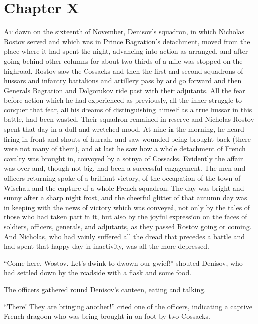 \chapter*{Chapter X}
\ifaudio     
{} 
\fi

\lettrine[lines=2, loversize=0.3, lraise=0]{\initfamily A}{t}
dawn on the sixteenth of November, Denisov's squadron, in
which Nicholas Rostov served and which was in Prince Bagration's
detachment, moved from the place where it had spent the night,
advancing into action as arranged, and after going behind other
columns for about two thirds of a mile was stopped on the
highroad. Rostov saw the Cossacks and then the first and second
squadrons of hussars and infantry battalions and artillery pass
by and go forward and then Generals Bagration and Dolgorukov ride
past with their adjutants. All the fear before action which he
had experienced as previously, all the inner struggle to conquer
that fear, all his dreams of distinguishing himself as a true
hussar in this battle, had been wasted. Their squadron remained
in reserve and Nicholas Rostov spent that day in a dull and
wretched mood.  At nine in the morning, he heard firing in front
and shouts of hurrah, and saw wounded being brought back (there
were not many of them), and at last he saw how a whole detachment
of French cavalry was brought in, convoyed by a sotnya of
Cossacks. Evidently the affair was over and, though not big, had
been a successful engagement. The men and officers returning
spoke of a brilliant victory, of the occupation of the town of
Wischau and the capture of a whole French squadron. The day was
bright and sunny after a sharp night frost, and the cheerful
glitter of that autumn day was in keeping with the news of
victory which was conveyed, not only by the tales of those who
had taken part in it, but also by the joyful expression on the
faces of soldiers, officers, generals, and adjutants, as they
passed Rostov going or coming. And Nicholas, who had vainly
suffered all the dread that precedes a battle and had spent that
happy day in inactivity, was all the more depressed.

``Come here, Wostov. Let's dwink to dwown our gwief!'' shouted
Denisov, who had settled down by the roadside with a flask and
some food.

The officers gathered round Denisov's canteen, eating and
talking.

``There! They are bringing another!'' cried one of the officers,
indicating a captive French dragoon who was being brought in on
foot by two Cossacks.

